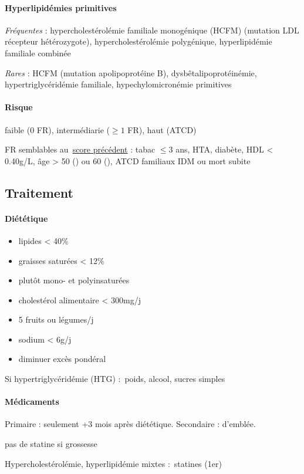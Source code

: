 \paragraph{Hyperlipidémies primitives}
\textit{Fréquentes}  : hypercholestérolémie familiale monogénique (HCFM) (mutation LDL récepteur
hétérozygote), hypercholestérolémie polygénique, hyperlipidémie familiale
combinée

\textit{Rares}  : HCFM (mutation apolipoprotéine B),
dysbêtalipoprotéinémie, hypertriglycéridémie familiale, hypechylomicronémie
primitives

\paragraph{Risque} faible (0 FR), intermédiarie ($\ge 1$ FR), haut (ATCD)

FR semblables au~\hyperref[subsec:fr]{score précédent} : tabac $\le 3$ ans, HTA, diabète, HDL < 0.40g/L, âge > 50
(\male) ou 60 (\female), ATCD familiaux IDM ou mort subite

\subsection{Traitement}

\paragraph{Diététique}
\begin{itemize}
  \item lipides < 40\%
  \item graisses saturées < 12\%
  \item plutôt mono- et polyinsaturées
  \item cholestérol alimentaire < 300mg/j
  \item 5 fruits ou légumes/j
  \item sodium < 6g/j
  \item diminuer excès pondéral
\end{itemize}
Si hypertriglycéridémie (HTG) : \dec poids, alcool, sucres simples

\paragraph{Médicaments}
Primaire : seulement +3 mois après diététique. Secondaire : d'emblée.

\danger pas de statine si grossesse

Hypercholestérolémie, hyperlipidémie mixtes : statines (1er)

